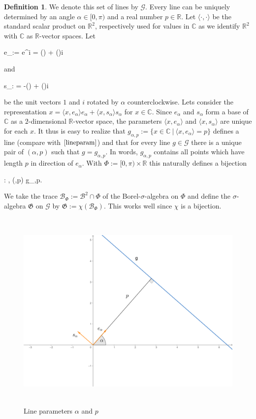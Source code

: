 \documentclass[12pt,a4paper]{scrartcl}
\newcommand{\C}{\mathbb{C}} %
\newcommand{\R}{\mathbb{R}} %
\newcommand{\1}{\mathbbm{1}}
\newcommand{\G}{\mathcal{G}}
\newcommand{\GG}{\mathfrak{G}}
\theoremstyle{definition}
\newtheorem{definition}{Definition}[subsection]
\numberwithin{equation}{section}
\begin{document}
\begin{definition} \label{linedef}
		We denote this set of lines by $\G$. Every line can be uniquely determined by an angle $\alpha\in [0,\pi)$ and a real number $p\in \R$. Let $\langle\cdot,\cdot\rangle$ be the standard scalar product on $\R^2$, respectively used for values in $\C$ as we identify $\R^2$ with $\C$ as $\R$-vector spaces. Let 
		\begin{flalign*}
			e_\alpha := e^{\alpha i} = \cos(\alpha) + \sin(\alpha)i
		\end{flalign*}
		and 
		\begin{flalign*}
			s_\alpha : = -\sin(\alpha) + \cos(\alpha)i
		\end{flalign*}
		be the unit vectors $1$ and $i$ rotated by $\alpha$ counterclockwise. Lets consider the representation $x = \langle x,e_\alpha\rangle e_\alpha + \langle x,s_\alpha\rangle s_\alpha$ for $x\in \C$. Since $e_\alpha$ and $s_\alpha$ form a base of $\C$ as a $2$-dimensional $\R$-vector space, the parameters $\langle x,e_\alpha\rangle$ and $\langle x, s_\alpha\rangle$ are unique for each $x$. It thus is easy to realize that $g_{\alpha,p} := \{x\in \C\ |\ \langle x,e_\alpha\rangle  = p\}$ defines a line (compare with $\autoref{lineparam}$) and that for every line $g\in\G$ there is a unique pair of $(\alpha, p)$ such that $g=g_{\alpha,p}$. In words, $g_{\alpha,p}$ contains all points which have length $p$ in direction of $e_\alpha$. With $\Phi := [0,\pi) \times \R$ this naturally defines a bijection
		\begin{flalign*}
			\chi: \Phi \to \G, \quad (\alpha,p) \mapsto g_{\alpha,p}. 
		\end{flalign*}
		We take the trace $\mathcal{B}_\Phi:= \mathcal{B}^2 \cap \Phi$ of the Borel-$\sigma$-algebra on $\Phi$ and define the $\sigma$-algebra $\GG$ on $\G$ by $\GG := \chi(\mathcal{B}_\Phi)$. This works well since $\chi$ is a bijection.
\end{definition}

	\begin{figure}
		\centering
		\includegraphics[height=10cm]{images/geogebra-images/line-param.png}
		\caption{Line parameters $\alpha$ and $p$} \label{lineparam}
	\end{figure}
	
\end{document}
